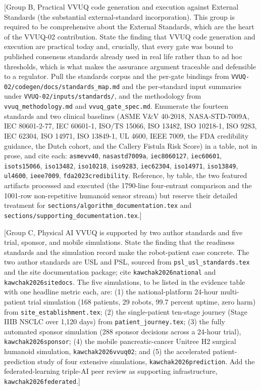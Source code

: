 [Group B, Practical VVUQ code generation and execution against External Standards
(the substantial external-standard incorporation). This group is required to be
comprehensive about the External Standards, which are the heart of the VVUQ-02
contribution. State the finding that VVUQ code generation and execution are
practical today and, crucially, that every gate was bound to published consensus
standards already used in real life rather than to ad hoc thresholds, which is
what makes the assurance argument traceable and defensible to a regulator. Pull
the standards corpus and the per-gate bindings from
\texttt{VVUQ-02/codegen/docs/standards\_map.md} and the per-standard input
summaries under \texttt{VVUQ-02/inputs/standards/}, and the methodology from
\texttt{vvuq\_methodology.md} and \texttt{vvuq\_gate\_spec.md}. Enumerate the
fourteen standards and two clinical baselines (ASME V\&V 40-2018, NASA-STD-7009A,
IEC 80601-2-77, IEC 60601-1, ISO/TS 15066, ISO 13482, ISO 10218-1, ISO 9283,
IEC 62304, ISO 14971, ISO 13849-1, UL 4600, IEEE 7009, the FDA credibility
guidance, the Dutch cohort, and the Callery Fistula Risk Score) in a table, not
in prose, and cite each: \texttt{asmevv40}, \texttt{nasastd7009a},
\texttt{iec8060127}, \texttt{iec60601}, \texttt{isots15066}, \texttt{iso13482},
\texttt{iso10218}, \texttt{iso9283}, \texttt{iec62304}, \texttt{iso14971},
\texttt{iso13849}, \texttt{ul4600}, \texttt{ieee7009}, \texttt{fda2023credibility}.
Reference, by table, the two featured artifacts processed and executed (the
1790-line four-entrant comparison and the 1001-row non-repetitive humanoid sensor
stream) but reserve their detailed treatment for
\texttt{sections/algorithm\_documentation.tex} and
\texttt{sections/supporting\_documentation.tex}.]

[Group C, Physical AI VVUQ is supported by two author standards and five trial,
sponsor, and mobile simulations. State the finding that the readiness standards
and the simulation record make the robot-patient case concrete. The two author
standards are USL and PSL, sourced from \texttt{psl\_usl\_standards.tex} and the
site documentation package; cite \texttt{kawchak2026national} and
\texttt{kawchak2026sitedocs}. The five simulations, to be listed in the evidence
table with one headline metric each, are: (1) the national-platform 24-hour
multi-patient trial simulation (168 patients, 29 robots, 99.7 percent uptime,
zero harm) from \texttt{site\_establishment.tex}; (2) the single-patient ten-stage
journey (Stage IIIB NSCLC over 1,120 days) from \texttt{patient\_journey.tex};
(3) the fully automated sponsor simulation (288 sponsor decisions across a
24-hour trial), \texttt{kawchak2026sponsor}; (4) the mobile pancreatic-cancer
Unitree H2 surgical humanoid simulation, \texttt{kawchak2026vvuq02}; and (5) the
accelerated patient-prediction study of four extensive simulations,
\texttt{kawchak2026prediction}. Add the federated-learning triple-AI peer review
as supporting infrastructure, \texttt{kawchak2026federated}.]

